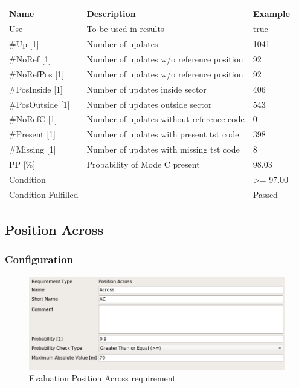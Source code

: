 \begin{center}
 \begin{table}[H]
  \begin{tabularx}{\textwidth}{ | l | X |  l | }
    \hline
    \textbf{Name} & \textbf{Description} & \textbf{Example} \\ \hline
    Use & To be used in results & true \\ \hline
    \#Up [1] & Number of updates & 1041 \\ \hline
    \#NoRef [1] & Number of updates w/o reference position & 92 \\ \hline
    \#NoRefPos [1] & Number of updates w/o reference position  & 92 \\ \hline
    \#PosInside [1] & Number of updates inside sector & 406 \\ \hline
    \#PosOutside [1] & Number of updates outside sector & 543 \\ \hline
    \#NoRefC [1] & Number of updates without reference code & 0 \\ \hline
    \#Present [1] & Number of updates with present tst code & 398 \\ \hline
    \#Missing [1] & Number of updates with missing tst code & 8 \\ \hline
    PP [\%] & Probability of Mode C present & 98.03 \\ \hline
    Condition &  & >= 97.00 \\ \hline
    Condition Fulfilled &  & Passed \\ \hline
\end{tabularx}
\end{table}
\end{center}

\subsection{Position Across}
\label{sec:eval_req_pos_across} 

\subsubsection{Configuration}

\begin{figure}[H]
    \includegraphics[width=14cm,frame]{figures/eval_req_pos_across.png}
  \caption{Evaluation Position Across requirement}
\end{figure}

